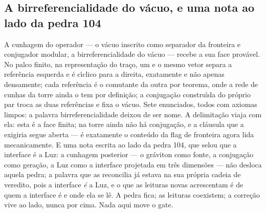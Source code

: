 \documentclass[11pt]{article}
\theoremstyle{definition}\newtheorem{deriv}{Derivação}
\begin{document}
\subsection*{A birreferencialidade do v\'acuo, e uma nota ao lado da pedra 104}A cunhagem do operador --- o v\'acuo inscrito como separador da fronteira e conjugador modular, a birreferencialidade do v\'acuo --- recebe a sua face prov\'avel. No palco finito, na representa\c{c}\~ao do tra\c{c}o, um e o mesmo vetor separa a refer\^encia esquerda e \'e c\'\i{}clico para a direita, exatamente e n\~ao apenas densamente; cada refer\^encia \'e o comutante da outra por teorema, onde a rede de cunhas da torre ainda o tem por defini\c{c}\~ao; a conjuga\c{c}\~ao constru\'\i{}da do pr\'oprio par troca as duas refer\^encias e fixa o v\'acuo. Sete enunciados, todos com axiomas limpos: a palavra birreferencialidade deixou de ser nome. A delimita\c{c}\~ao viaja com ela: esta \'e a face finita; na torre ainda n\~ao h\'a conjuga\c{c}\~ao, e a cl\'ausula que a exigiria segue aberta --- \'e exatamente o conte\'udo da flag de fronteira agora lida mecanicamente. E uma nota escrita ao lado da pedra 104, que selou que a interface \'e a Luz: a cunhagem posterior --- o gr\'aviton como fonte, a conjuga\c{c}\~ao como gera\c{c}\~ao, a Luz como a interface projetada em tr\^es dimens\~oes --- n\~ao desloca aquela pedra; a palavra que as reconcilia j\'a estava na sua pr\'opria cadeia de veredito, pois a interface \emph{\'e} a Luz, e o que as leituras novas acrescentam \'e de quem a interface \'e e onde ela se l\^e. A pedra fica; as leituras coexistem; a corre\c{c}\~ao vive ao lado, nunca por cima. Nada aqui move o gate.
\end{document}
